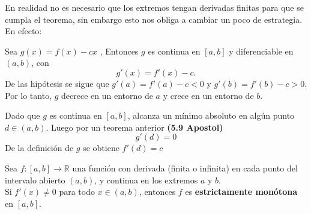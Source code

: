 \begin{remark}
    En realidad no es necesario que los extremos tengan derivadas finitas para que se cumpla el teorema, sin embargo esto nos obliga a cambiar un poco de estrategia. En efecto: 

\vspace{0.5cm}
Sea \(g(x) = f(x) - cx\) , Entonces $g$ es continua en $[a,b]$ y diferenciable en $(a,b)$, con 
\[
g'(x) = f'(x) - c.
\]
De las hipótesis se sigue que $g'(a) = f'(a) - c < 0$ y $g'(b) = f'(b) - c > 0$. Por lo tanto, $g$ decrece en un entorno de $a$ y crece en un entorno de $b$.

Dado que $g$ es continua en $[a,b]$, alcanza un mínimo absoluto en algún punto 
$d \in (a,b)$. Luego por un teorema anterior \textbf{(5.9 Apostol)} \[g'(d) = 0\]
De la definición de $g$ se obtiene \( f'(d) = c\)
\end{remark}
\begin{teorema}
    Sea $f: [a, b] \to \mathbb{R}$ una función con derivada (finita o infinita) en cada punto del intervalo abierto $(a, b)$, y continua en los extremos $a$ y $b$. \\
	Si $f'(x) \neq 0$ para todo $x \in (a, b)$, entonces $f$ es \textbf{estrictamente monótona} en $[a, b]$.
\end{teorema}
